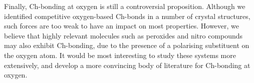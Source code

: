 \begin{refsection}
Finally, Ch-bonding at oxygen is still a controversial proposition.
Although we identified competitive oxygen-based Ch-bonds in a number of crystal structures, such forces are too weak to have an impact on most properties.
However, we believe that highly relevant molecules such as peroxides and nitro compounds may also exhibit Ch-bonding, due to the presence of a polarising substituent on the oxygen atom.
It would be most interesting to study these systems more extensively, and develop a more convincing body of literature for Ch-bonding at oxygen.

\printbibliography[heading=subbibliography]
\end{refsection}
